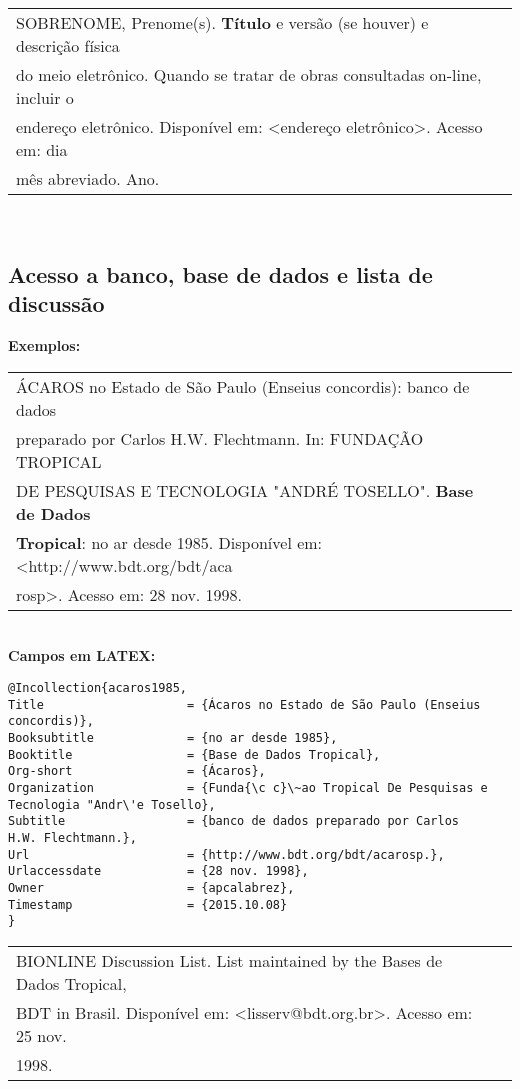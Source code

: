 \begin{tabular}{|l|c|} \hline
SOBRENOME, Prenome(s). \textbf{Título} e versão (se houver) e descrição física \\do meio eletrônico. Quando se tratar de obras consultadas on-line, incluir o \\ endereço eletrônico. Disponível em: <endereço eletrônico>. Acesso em: dia \\mês abreviado. Ano. 
	\\\hline
\end{tabular} \\

\subsection{Acesso a banco, base de dados e lista de discussão}

\textbf{Exemplos:} \\

\begin{tabular}{|l|c|} \hline
ÁCAROS no Estado de São Paulo (Enseius concordis): banco de dados\\ preparado por Carlos H.W. Flechtmann. In: FUNDAÇÃO TROPICAL \\DE PESQUISAS E TECNOLOGIA "ANDRÉ TOSELLO". \textbf{Base de Dados} \\\textbf{Tropical}: no ar desde 1985. Disponível em: <http://www.bdt.org/bdt/aca\\rosp>. Acesso em: 28 nov. 1998. 
	\\\hline
\end{tabular} \\

\textbf{Campos em LATEX:} 

\begin{verbatim}
@Incollection{acaros1985,
Title                    = {Ácaros no Estado de São Paulo (Enseius 
concordis)},
Booksubtitle             = {no ar desde 1985},
Booktitle                = {Base de Dados Tropical},
Org-short                = {Ácaros},
Organization             = {Funda{\c c}\~ao Tropical De Pesquisas e 
Tecnologia "Andr\'e Tosello},
Subtitle                 = {banco de dados preparado por Carlos 
H.W. Flechtmann.},
Url                      = {http://www.bdt.org/bdt/acarosp.},
Urlaccessdate            = {28 nov. 1998},
Owner                    = {apcalabrez},
Timestamp                = {2015.10.08}
}
\end{verbatim}

\begin{tabular}{|l|c|} \hline
BIONLINE Discussion List. List maintained by the Bases de Dados Tropical, \\BDT in Brasil. Disponível em: <lisserv@bdt.org.br>. Acesso em: 25 nov.\\1998. 
	\\\hline
\end{tabular} \\

